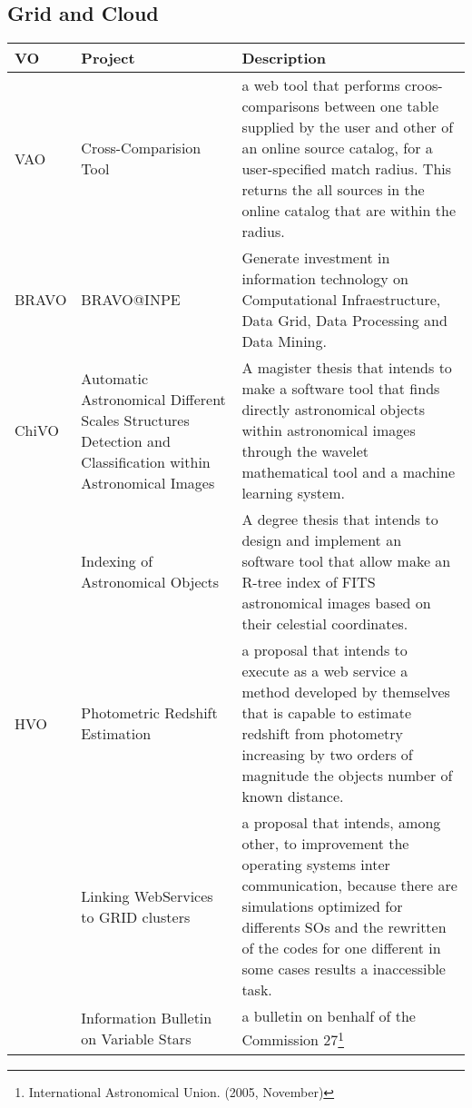 
\subsection{Grid and Cloud}
\begin{table*}[h!t]
	\centering
	\begin{tabular}{|l|p{3cm}|p{12.5cm}|}
	\hline
	\textbf{VO} 		& \textbf{Project} & \textbf{Description} \\
	\hline
	VAO 	& Cross-Comparision Tool & a web tool that performs croos-comparisons between one table supplied by the user and other of an online source 
								catalog, for a user-specified match radius. This returns the all sources in the online catalog that are within the radius.\\
	\hline
	BRAVO	& BRAVO@INPE & Generate investment in information technology on Computational Infraestructure, Data Grid, Data Processing and Data Mining.\\
	\hline
	ChiVO	& Automatic Astronomical Different Scales Structures Detection and Classification within Astronomical Images & A magister thesis that intends to 
								make a software tool that finds directly astronomical objects within astronomical images through the wavelet mathematical 
								tool and a machine learning system.\\
			& Indexing of Astronomical Objects & A degree thesis that intends to design and implement an software tool that allow make an R-tree index of 
								FITS astronomical images based on their celestial coordinates. \\
	\hline
	HVO		& Photometric Redshift Estimation & a proposal that intends to execute as a web service a method developed by themselves that is capable to 
								estimate redshift from photometry increasing by two orders of magnitude the objects number of known distance. \\
			& Linking WebServices to GRID clusters & a proposal that intends, among other, to improvement the operating systems inter communication, because 
								there are simulations optimized for differents SOs and the rewritten of the codes for one different in some cases results a 
								inaccessible task.\\
			& Information Bulletin on Variable Stars & a bulletin on benhalf of the Commission 27\footnote{International Astronomical Union. (2005, November)
}
\end{tabular}
\end{table*}
